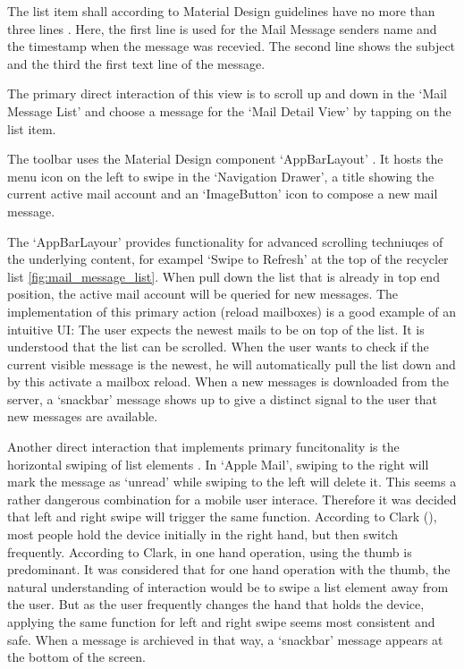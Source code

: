 \documentclass[a4paper,11pt,twoside]{article}
\begin{document}
The list item shall according to Material Design guidelines have no more
than  three lines \cite{material_lists}. Here, the first line is used for the
Mail Message senders name and the timestamp when the message was recevied. The
second line shows the subject and the third the first text line of the message.

The primary direct interaction of this view is to scroll up and down in the
`Mail Message List' and choose a message for the `Mail Detail View' by tapping
on the list item.

The toolbar uses the Material Design component `AppBarLayout'
\cite{appbar_layout}. It hosts the menu icon on the left to swipe in the
`Navigation Drawer', a title showing the current active mail account and an
`ImageButton' icon to compose a new mail message.

The `AppBarLayour' provides functionality for advanced scrolling
techniuqes of the underlying content, for exampel `Swipe to Refresh' at
the top of the recycler list \ref{fig:mail_message_list}.
When pull down the list that is already in top end
position, the active mail account will be queried for new messages. The
implementation of this primary action (reload mailboxes) is a good example
of an intuitive UI: The user expects the newest mails to be on top of the list.
It is understood that the list can be scrolled. When the user wants to check if
the current visible message is the newest, he will automatically pull the list
down and by this activate a mailbox reload. When a new messages is downloaded
from the server, a `snackbar' message shows up to give a distinct signal to the
user that new messages are available.

Another direct interaction that implements primary funcitonality is the
horizontal swiping of list elements \cite['Leave-behinds']{material_list_controls}.
In `Apple Mail', swiping to the right will
mark the message as `unread' while swiping to the left will delete it. This seems
a rather dangerous combination for a mobile user interace. Therefore it was
decided that left and right swipe will trigger the
same function. According to Clark (\cite[chapter1, `Hold the
phone']{clark2015}), most people hold the device initially in the right hand,
but then switch frequently. According to Clark, in one hand operation, using the
thumb is predominant. It was considered  that for one hand operation with the
thumb, the natural understanding of interaction would be to swipe a list element
away from the user. But as the user frequently changes the hand that holds the
device, applying the same function for left and right swipe seems most
consistent and safe. When a message is archieved in that way, a `snackbar'
message appears at the bottom of the screen.
\end{document}
